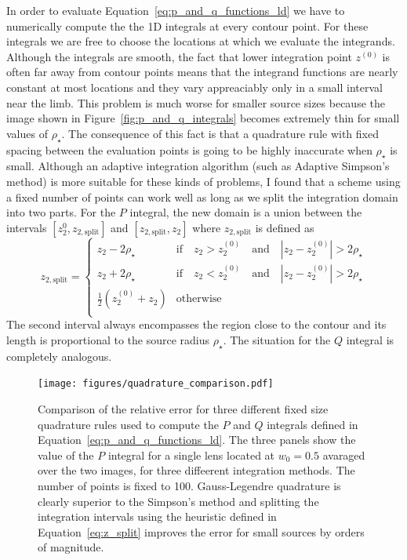 \documentclass[12pt,dvipsnames]{report}
\begin{document}
In order to evaluate Equation~\ref{eq:p_and_q_functions_ld} we have to numerically compute the 
the 1D integrals at every contour point. For these integrals we are free to choose the locations
at which we evaluate the integrands. Although the integrals are smooth, the fact that 
lower integration point $z^{(0)}$ is often far away from contour points means that the integrand
functions are nearly constant at most locations and they vary appreaciably only in a small
interval near the limb. This problem is much worse for smaller source sizes because the 
image shown in Figure~\ref{fig:p_and_q_integrals} becomes extremely thin for small values 
of $\rho_\star$. The consequence of this fact is that a quadrature rule with fixed spacing 
between the evaluation points is going to be highly inaccurate when $\rho_\star$ is small.
Although an adaptive integration algorithm (such as Adaptive Simpson's method) is more suitable
for these kinds of problems, I found that a scheme using a fixed number of points can work 
well as long as we split the integration domain into two parts. 
For the $P$ integral, the new domain is a union between the intervals $[z_2^{0}, z_{2,\mathrm{split}}]$
and $[z_{2,\mathrm{split}}, z_2]$ where $z_{2, \mathrm{split}}$ is defined as 
\begin{equation}
        z_{2,\mathrm{split}}=
    \begin{cases}
       z_2 - 2\rho_\star & \text{if}\quad z_2> z_2^{(0)} \quad\text{and}\quad |z_2 - z_2^{(0)}|>2\rho_\star\\
       z_2 + 2\rho_\star & \text{if}\quad z_2 < z_2^{(0)} \quad\text{and}\quad |z_2 - z_2^{(0)}|>2\rho_\star\\
       \frac{1}{2}(z_2^{(0)} + z_2) &\text{otherwise}\\
    \end{cases}
    \label{eq:z_split}
\end{equation}
The second interval always encompasses the region close to the contour and its length 
is proportional to the source radius $\rho_\star$. The situation for the $Q$ integral is 
completely analogous. 

\begin{figure}[t]
    \begin{centering}
        \texttt{[image: figures/quadrature\_comparison.pdf]}
        \caption{Comparison of the relative error for three different fixed size quadrature rules 
        used to compute the $P$ and $Q$ integrals defined in 
        Equation~\ref{eq:p_and_q_functions_ld}. The three panels show the value of the $P$ integral 
        for a single lens located at $w_0=0.5$ avaraged 
        over the two images, for three diffeerent integration methods. The number of points 
        is fixed to 100. Gauss-Legendre quadrature is clearly superior to the Simpson's method
        and splitting the integration intervals using the heuristic defined in 
        Equation~\ref{eq:z_split} improves the error for small sources by orders of magnitude.}
        \label{fig:quadrature_comparison}
    \end{centering}
\end{figure}
\end{document}

